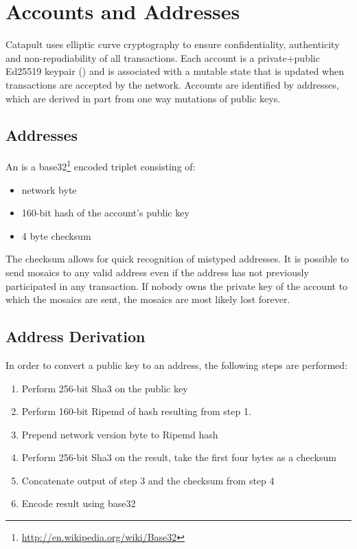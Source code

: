 \section{Accounts and Addresses}
\label{sec:accounts}

Catapult uses elliptic curve cryptography to ensure confidentiality, authenticity and non-repudiability of all transactions.
Each account is a private+public Ed25519 keypair () and is associated with a mutable state that is updated when transactions are accepted by the network.
Accounts are identified by addresses, which are derived in part from one way mutations of public keys.

\subsection{Addresses}

An  is a base32\footnote{ \url{http://en.wikipedia.org/wiki/Base32} } encoded triplet consisting of:
\begin{itemize}
	\item{network byte}
	\item{160-bit hash of the account's public key}
	\item{4 byte checksum}
\end{itemize}

The checksum allows for quick recognition of mistyped addresses.
It is possible to send mosaics to any valid address even if the address has not previously participated in any transaction.
If nobody owns the private key of the account to which the mosaics are sent, the mosaics are most likely lost forever.

\subsection{Address Derivation}
In order to convert a public key to an address, the following steps are performed:
\begin{enumerate}
	\item{Perform 256-bit Sha3 on the public key}
	\item{Perform 160-bit Ripemd of hash resulting from step 1.}
	\item{Prepend network version byte to Ripemd hash}
	\item{Perform 256-bit Sha3 on the result, take the first four bytes as a checksum}
	\item{Concatenate output of step 3 and the checksum from step 4}
	\item{Encode result using base32}
\end{enumerate}

